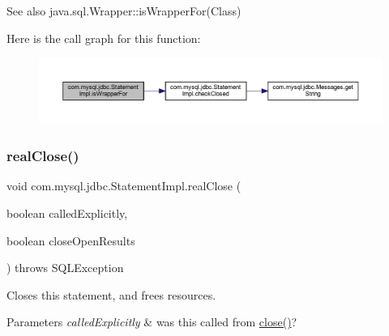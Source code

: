 \begin{DoxySeeAlso}{See also}
java.\+sql.\+Wrapper\+::is\+Wrapper\+For(\+Class) 
\end{DoxySeeAlso}
Here is the call graph for this function\+:
\nopagebreak
\begin{figure}[H]
\begin{center}
\leavevmode
\includegraphics[width=350pt]{classcom_1_1mysql_1_1jdbc_1_1_statement_impl_a97ce8b90fd0b4404140b1fe9fbe3d3da_cgraph}
\end{center}
\end{figure}
\mbox{\label{classcom_1_1mysql_1_1jdbc_1_1_statement_impl_a1e0670e4c9378bf2790c688208dc8913}} 
\subsubsection{\texorpdfstring{real\+Close()}{realClose()}}
{\footnotesize\ttfamily void com.\+mysql.\+jdbc.\+Statement\+Impl.\+real\+Close (\begin{DoxyParamCaption}\item[{boolean}]{called\+Explicitly,  }\item[{boolean}]{close\+Open\+Results }\end{DoxyParamCaption}) throws S\+Q\+L\+Exception\hspace{0.3cm}{\ttfamily [protected]}}

Closes this statement, and frees resources.


\begin{DoxyParams}{Parameters}
{\em called\+Explicitly} & was this called from \mbox{\hyperlink{classcom_1_1mysql_1_1jdbc_1_1_statement_impl_a740a220f82b06eace44154a089fbdf18}{close()}}?\\
\hline
\end{DoxyParams}


